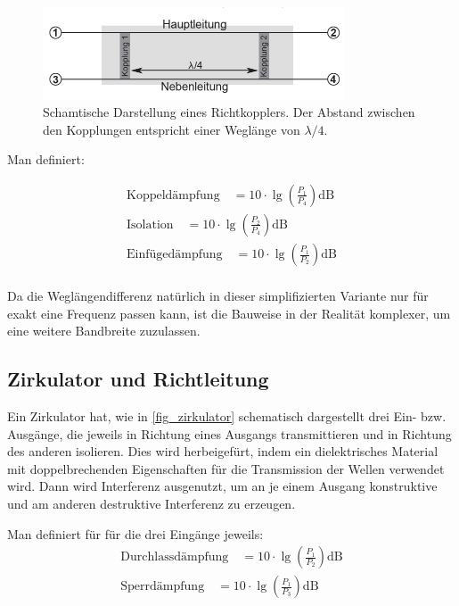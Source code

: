 \documentclass[
	a4paper,
	12pt,
	pagesize,
	ngerman
]{scrartcl}
\begin{document}
	\begin{figure}[H]
		\includegraphics[width=0.8\textwidth]{img/richtkoppler.png}
		\centering
		\caption{
			Schamtische Darstellung eines Richtkopplers. Der Abstand zwischen den Kopplungen entspricht einer Weglänge von $\lambda/4$. \cite{Anleitung}
		}
		\label{fig_richtkoppler}
		\centering
	\end{figure}

	Man definiert:

	\begin{align}
		\text{Koppeldämpfung} \quad = 10 \cdot \lg{ \left( \frac{P_1}{P_4} \right) } \si{\deci \bel}
		\label{eq_koppeld}\\
		\text{Isolation} \quad = 10 \cdot \lg{ \left( \frac{P_2}{P_4} \right) } \si{\deci \bel}
		\label{eq_isolation}\\
		\text{Einfügedämpfung} \quad = 10 \cdot \lg{ \left( \frac{P_1}{P_2} \right) } \si{\deci \bel}
		\label{eq_einfueged}\\
	\end{align}

	Da die Weglängendifferenz natürlich in dieser simplifizierten Variante nur für exakt eine Frequenz passen kann, ist die Bauweise in der Realität komplexer, um eine weitere Bandbreite zuzulassen.

	\subsection{Zirkulator und Richtleitung}

	Ein Zirkulator hat, wie in \cref{fig_zirkulator} schematisch dargestellt drei Ein- bzw. Ausgänge, die jeweils in Richtung eines Ausgangs transmittieren und in Richtung des anderen isolieren.
	Dies wird herbeigefürt, indem ein dielektrisches Material mit doppelbrechenden Eigenschaften für die Transmission der Wellen verwendet wird.
	Dann wird Interferenz ausgenutzt, um an je einem Ausgang konstruktive und am anderen destruktive Interferenz zu erzeugen.

	Man definiert für für die drei Eingänge jeweils:
	\begin{align}
		\text{Durchlassdämpfung} \quad = 10 \cdot \lg{ \left( \frac{P_1}{P_2} \right) } \si{\deci \bel}
		\label{eq_durchlassd}\\
		\text{Sperrdämpfung} \quad = 10 \cdot \lg{ \left( \frac{P_1}{P_3} \right) } \si{\deci \bel}
		\label{eq_sperrd}\\
	\end{align}
\end{document}
